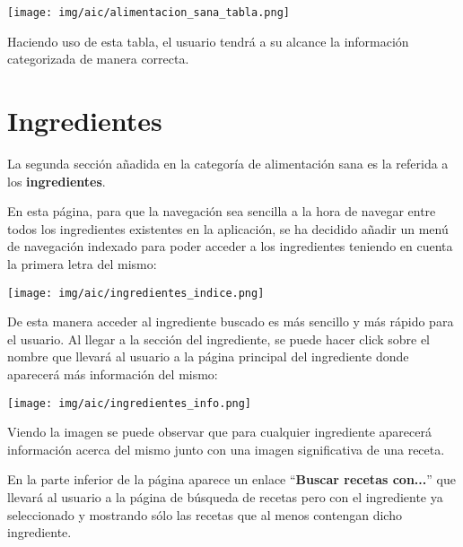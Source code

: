 \documentclass{\ClassPath/viu-tfm-template}
\begin{document}
\begin{center}
    \vspace{-10pt}
    \texttt{[image: img/aic/alimentacion\_sana\_tabla.png]}
    \vspace{-20pt}
\end{center}

Haciendo uso de esta tabla, el usuario tendrá a su alcance la información categorizada de manera correcta.


\section{Ingredientes}
La segunda sección añadida en la categoría de alimentación sana es la referida a los \textbf{ingredientes}.

En esta página, para que la navegación sea sencilla a la hora de navegar entre todos los ingredientes existentes en la aplicación, se ha decidido añadir un menú de navegación indexado para poder acceder a los ingredientes teniendo en cuenta la primera letra del mismo:


\begin{center}
    \vspace{-10pt}
    \texttt{[image: img/aic/ingredientes\_indice.png]}
    \vspace{-20pt}
\end{center}

De esta manera acceder al ingrediente buscado es más sencillo y más rápido para el usuario. Al llegar a la sección del ingrediente, se puede hacer click sobre el nombre que llevará al usuario a la página principal del ingrediente donde aparecerá más información del mismo:

\begin{center}
    \vspace{-10pt}
    \texttt{[image: img/aic/ingredientes\_info.png]}
    \vspace{-20pt}
\end{center}

Viendo la imagen se puede observar que para cualquier ingrediente aparecerá información acerca del mismo junto con una imagen significativa de una receta.

En la parte inferior de la página aparece un enlace “\textbf{{\color{maincolor}Buscar recetas con...}}” que llevará al usuario a la página de búsqueda de recetas pero con el ingrediente ya seleccionado y mostrando sólo las recetas que al menos contengan dicho ingrediente.
\end{document}
